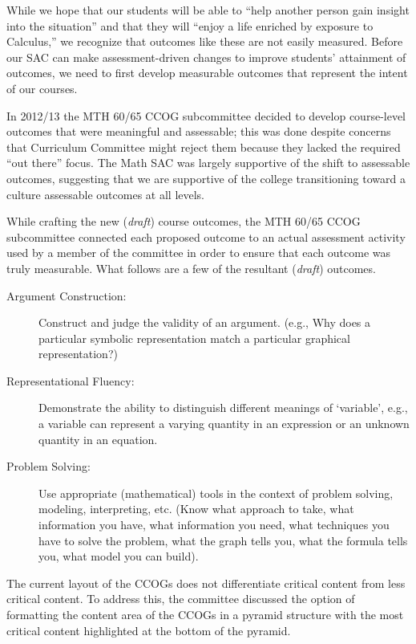 While we hope that our students will be able to ``help another person gain
insight into the situation'' and that they will ``enjoy a life enriched by
exposure to Calculus,'' we recognize that outcomes like these are not easily
measured. Before our SAC can make assessment-driven changes to improve students'
attainment of outcomes, we need to first develop measurable outcomes that
represent the intent of our courses.

In 2012/13 the MTH 60/65 CCOG subcommittee decided to develop course-level
outcomes that were meaningful and assessable; this was done despite concerns
that Curriculum Committee might reject them because they lacked the required
``out there'' focus.  The Math SAC was largely supportive of the shift to
assessable outcomes, suggesting that we are supportive of the college
transitioning toward a culture assessable outcomes at all levels.  

While crafting the new (\emph{draft}) course outcomes, the MTH 60/65 CCOG
subcommittee connected each proposed outcome to an actual assessment activity
used by a member of the committee in order to ensure that each outcome was truly
measurable.  What follows are a few of the resultant (\emph{draft}) outcomes.
\begin{description}
\item[Argument Construction:] Construct and judge the validity of an argument.
  (e.g., Why does a particular symbolic representation match a particular
  graphical representation?)

\item[Representational Fluency:] Demonstrate the ability to distinguish
  different meanings of `variable', e.g., a variable can represent a varying
  quantity in an expression or an unknown quantity in an equation.

\item[Problem Solving:] Use appropriate (mathematical) tools in the context of
  problem solving, modeling, interpreting, etc. (Know what approach to take,
  what information you have, what information you need, what techniques you have
  to solve the problem, what the graph tells you, what the formula tells you,
  what model you can build).
\end{description}

The current layout of the CCOGs does not differentiate critical content from
less critical content.  To address this, the committee discussed the option of
formatting the content area of the CCOGs in a pyramid structure with the most
critical content highlighted at the bottom of the pyramid.  

